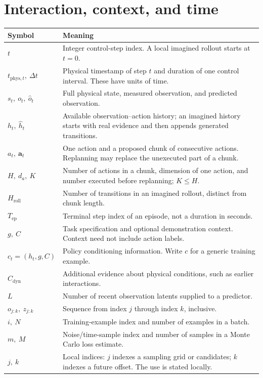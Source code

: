 \section*{Interaction, context, and time}
\begin{longtable}{@{}p{40mm}p{116mm}@{}}
\toprule Symbol & Meaning\\\midrule\endhead
$t$ & Integer control-step index. A local imagined rollout starts at $t=0$.\\
$t_{\mathrm{phys},t},\ \Delta t$ & Physical timestamp of step $t$ and duration of one control interval. These have units of time.\\
$s_t,\ o_t,\ \widehat o_t$ & Full physical state, measured observation, and predicted observation.\\
$h_t,\ \widehat h_t$ & Available observation--action history; an imagined history starts with real evidence and then appends generated transitions.\\
$a_t,\ \mathbf a_t$ & One action and a proposed chunk of consecutive actions. Replanning may replace the unexecuted part of a chunk.\\
$H,\ d_a,\ K$ & Number of actions in a chunk, dimension of one action, and number executed before replanning; $K\leq H$.\\
$H_{\mathrm{roll}}$ & Number of transitions in an imagined rollout, distinct from chunk length.\\
$T_{\mathrm{ep}}$ & Terminal step index of an episode, not a duration in seconds.\\
$g,\ C$ & Task specification and optional demonstration context. Context need not include action labels.\\
$c_t=(h_t,g,C)$ & Policy conditioning information. Write $c$ for a generic training example.\\
$C_{\mathrm{dyn}}$ & Additional evidence about physical conditions, such as earlier interactions.\\
$L$ & Number of recent observation latents supplied to a predictor.\\
$o_{j:k},\ z_{j:k}$ & Sequence from index $j$ through index $k$, inclusive.\\
$i,\ N$ & Training-example index and number of examples in a batch.\\
$m,\ M$ & Noise/time-sample index and number of samples in a Monte Carlo loss estimate.\\
$j,\ k$ & Local indices: $j$ indexes a sampling grid or candidates; $k$ indexes a future offset. The use is stated locally.\\
\bottomrule
\end{longtable}

